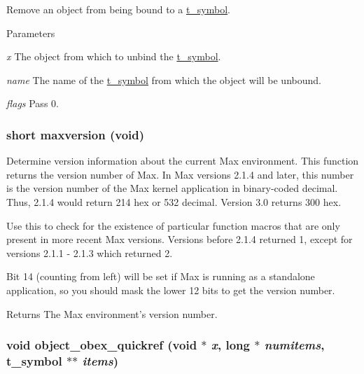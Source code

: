 Remove an object from being bound to a \hyperlink{structt__symbol}{t\_\-symbol}. 
\begin{DoxyParams}{Parameters}
\item[{\em x}]The object from which to unbind the \hyperlink{structt__symbol}{t\_\-symbol}. \item[{\em name}]The name of the \hyperlink{structt__symbol}{t\_\-symbol} from which the object will be unbound. \item[{\em flags}]Pass 0. \end{DoxyParams}
\hypertarget{group__misc_ga0eaf32722b98ab4920cb6f64b45a5d5b}{
\subsubsection[{maxversion}]{\setlength{\rightskip}{0pt plus 5cm}short maxversion (void)}}
\label{group__misc_ga0eaf32722b98ab4920cb6f64b45a5d5b}


Determine version information about the current Max environment. This function returns the version number of Max. In Max versions 2.1.4 and later, this number is the version number of the Max kernel application in binary-\/coded decimal. Thus, 2.1.4 would return 214 hex or 532 decimal. Version 3.0 returns 300 hex.

Use this to check for the existence of particular function macros that are only present in more recent Max versions. Versions before 2.1.4 returned 1, except for versions 2.1.1 -\/ 2.1.3 which returned 2.

Bit 14 (counting from left) will be set if Max is running as a standalone application, so you should mask the lower 12 bits to get the version number.

\begin{DoxyReturn}{Returns}
The Max environment's version number. 
\end{DoxyReturn}
\hypertarget{group__misc_ga332b8831bb1a42503b13d16269fc5ade}{
\subsubsection[{object\_\-obex\_\-quickref}]{\setlength{\rightskip}{0pt plus 5cm}void object\_\-obex\_\-quickref (void $\ast$ {\em x}, \/  long $\ast$ {\em numitems}, \/  {\bf t\_\-symbol} $\ast$$\ast$ {\em items})}}
\label{group__misc_ga332b8831bb1a42503b13d16269fc5ade}


